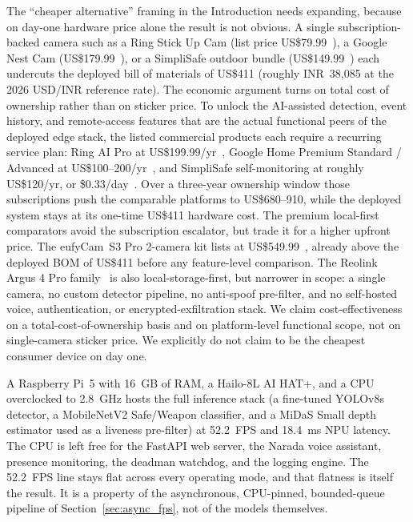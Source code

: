 \documentclass{ieeeaccess}
\begin{document}
The ``cheaper alternative'' framing in the Introduction needs expanding, because on day-one hardware price alone the result is not obvious. A single subscription-backed camera such as a Ring Stick Up Cam (list price US\$79.99~\cite{b33}), a Google Nest Cam (US\$179.99~\cite{b35}), or a SimpliSafe outdoor bundle (US\$149.99~\cite{b37}) each undercuts the deployed bill of materials of US\$411 (roughly INR~38{,}085 at the 2026 USD/INR reference rate). The economic argument turns on total cost of ownership rather than on sticker price. To unlock the AI-assisted detection, event history, and remote-access features that are the actual functional peers of the deployed edge stack, the listed commercial products each require a recurring service plan: Ring AI Pro at US\$199.99/yr~\cite{b34}, Google Home Premium Standard / Advanced at US\$100--200/yr~\cite{b36}, and SimpliSafe self-monitoring at roughly US\$120/yr, or \$0.33/day~\cite{b38}. Over a three-year ownership window those subscriptions push the comparable platforms to US\$680--910, while the deployed system stays at its one-time US\$411 hardware cost. The premium local-first comparators avoid the subscription escalator, but trade it for a higher upfront price. The eufyCam~S3 Pro 2-camera kit lists at US\$549.99~\cite{b39}, already above the deployed BOM of US\$411 before any feature-level comparison. The Reolink Argus 4 Pro family~\cite{b40} is also local-storage-first, but narrower in scope: a single camera, no custom detector pipeline, no anti-spoof pre-filter, and no self-hosted voice, authentication, or encrypted-exfiltration stack. We claim cost-effectiveness on a total-cost-of-ownership basis and on platform-level functional scope, not on single-camera sticker price. We explicitly do not claim to be the cheapest consumer device on day one.

A Raspberry Pi~5 with 16~GB of RAM, a Hailo-8L AI HAT+, and a CPU overclocked to 2.8~GHz hosts the full inference stack (a fine-tuned YOLOv8s detector, a MobileNetV2 Safe/Weapon classifier, and a MiDaS Small depth estimator used as a liveness pre-filter) at 52.2~FPS and 18.4~ms NPU latency. The CPU is left free for the FastAPI web server, the Narada voice assistant, presence monitoring, the deadman watchdog, and the logging engine. The 52.2~FPS line stays flat across every operating mode, and that flatness is itself the result. It is a property of the asynchronous, CPU-pinned, bounded-queue pipeline of Section~\ref{sec:async_fps}, not of the models themselves.
\end{document}
